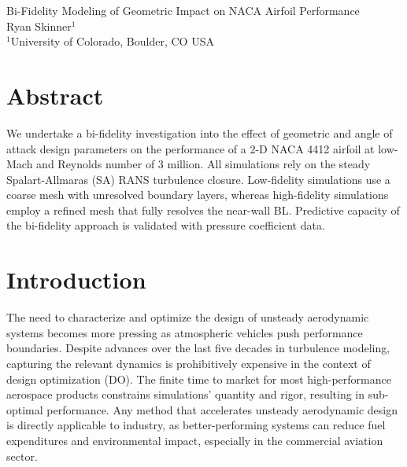 \documentclass[11pt]{article}
\begin{document}
{
	\fancyhf[LH]{}
	\fancyhf[CH]{}
	\fancyhf[RH]{\thepage}
	\fancyhf[LF]{}
	\fancyhf[CF]{}
	\fancyhf[RF]{}
}

{
	\fancyhf[CH]{}
	\fancyhf[LF]{}
	\fancyhf[CF]{}
	\fancyhf[RF]{}
}

\pagestyle{allpages}
\thispagestyle{firstpage}
\renewcommand{\sectionmark}[1]{ \markright{#1}{} }

\vspace*{0in}
\begin{center}
\Large
Bi-Fidelity Modeling of Geometric Impact on NACA Airfoil Performance
\\[1ex]
\large
Ryan Skinner$^1$
\\[1ex]
\normalsize
$^1$University of Colorado, Boulder, CO USA
\end{center}
\vspace*{0.3in}

\section*{Abstract}
We undertake a bi-fidelity investigation into the effect of geometric and angle of attack design parameters on the performance of a 2-D NACA 4412 airfoil at low-Mach and Reynolds number of 3 million. All simulations rely on the steady Spalart-Allmaras (SA) RANS turbulence closure. Low-fidelity simulations use a coarse mesh with unresolved boundary layers, whereas high-fidelity simulations employ a refined mesh that fully resolves the near-wall BL. Predictive capacity of the bi-fidelity approach is validated with pressure coefficient data.

\section{Introduction}

The need to characterize and optimize the design of unsteady aerodynamic systems becomes more pressing as atmospheric vehicles push performance boundaries. Despite advances over the last five decades in turbulence modeling, capturing the relevant dynamics is prohibitively expensive in the context of design optimization (DO). The finite time to market for most high-performance aerospace products constrains simulations' quantity and rigor, resulting in sub-optimal performance. Any method that accelerates unsteady aerodynamic design is directly applicable to industry, as better-performing systems can reduce fuel expenditures and environmental impact, especially in the commercial aviation sector.
\end{document}
